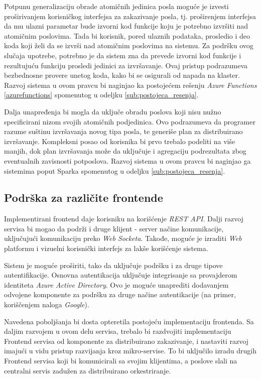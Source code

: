 \documentclass[12pt,oneside]{memoir}
\begin{document}
Potpunu generalizaciju obrade atomičnih jedinica posla moguće je izvesti proširivanjem korisničkog interfejsa za zakazivanje posla, tj. proširenjem interfejsa da mu ulazni parametar bude izvorni kod funkcije koju je potrebno izvršiti nad atomičnim poslovima. Tada bi korisnik, pored ulaznih podataka, prosledio i deo koda koji želi da se izvrši nad atomičnim poslovima na sistemu. Za podršku ovog slučaja upotrebe, potrebno je da sistem zna da prevede izvorni kod funkcije i rezultujuću funkciju prosledi jedinici za izvršavanje. Ovaj pristup podrazumeva bezbednosne provere unetog koda, kako bi se osigurali od napada na klaster. Razvoj sistema u ovom pravcu bi naginjao ka postojećem rešenju \emph{Azure Functions} \ref{azurefunctions} spomenutog u odeljku \ref{sub:postojeca_resenja}.

Dalja unapređenja bi mogla da uključe obradu poslova koji nisu nužno specificirani nizom svojih atomičnih podjedinica. Ovo podrazumeva da programer razume suštinu izvršavanja novog tipa posla, te generiše plan za distribuirano izvršavanje. Kompleksni posao od korisnika bi prvo trebalo podeliti na više manjih, dok plan izvršavanja može da uključuje i agregaciju podrezultata zbog eventualnih zavisnosti potposlova. Razvoj sistema u ovom pravcu bi naginjao ga sistemima poput Sparka \cite{Spark} spomenutog u odeljku \ref{sub:postojeca_resenja}.

\subsection{Podrška za različite frontende}

Implementirani frontend daje korisniku na korišćenje \emph{REST API}. Dalji razvoj servisa bi mogao da podrži i druge klijent - server načine komunikacije, uključujući komunikaciju preko \emph{Web Socketa}. Takođe, moguće je izraditi \emph{Web} platformu i vizuelni korisnički interfejs za lakše korišćenje sistema.

Sistem je moguće proširiti, tako da uključuje podršku i za druge tipove autentifikacije. Osnovna autentikacija uključuje integrisanje sa provajderom identiteta \emph{Azure Active Directory}. Ovo je moguće unaprediti dodavanjem odvojene komponente za podršku za druge načine autentikacije (na primer, koriščenjem naloga \emph{Google}).

Navedena poboljšanja bi dosta opteretila postojeću implementaciju frontenda. Sa daljim razvojem u ovom delu servisa, trebalo bi razdvojiti implementaciju Frontend servisa od komponente za distribuirano zakazivanje, i nastaviti razvoj imajući u vidu pristup razvijanja kroz mikro-servise. To bi uključilo izradu drugih Frontend servisa koji bi komunicirali sa svojim klijentima, a poslove slali na centralni servis zadužen za distribuirano orkestriranje.
\end{document}

